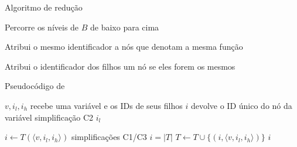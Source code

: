 \expandafter\documentclass\expandafter[table, usenames, svgnames, dvipsnames,14pt, \classopts]{beamer}
\begin{document}
\begin{frame}{Algoritmo de redução}

    \small
    \begin{outline}
        \1 Percorre os níveis de $B$ de baixo para cima
            
        \1 Atribui o mesmo identificador a nós que denotam a mesma função
        
        \1 Atribui o identificador dos filhos um nó se eles forem os mesmos
    \end{outline}

\end{frame}

\begin{frame}{Pseudocódigo de }
    \begin{algorithm}[H]
        \scriptsize
        \begin{algorithmic}[1]
            \Require $v,i_l,i_h$ \Comment recebe uma variável e os IDs de seus filhos
            \Ensure $i$ \Comment devolve o ID único do nó da variável
                     \Comment simplificação C2
                        \State \Return $i_l$
                    \EndIf
                \EndIf
            
                \State $i \gets T(\langle v,i_l,i_h \rangle)$
                 \Comment simplificações C1/C3
                    \State $i = |T|$
                    \State $T \gets T \cup \{(i, \langle v,i_l,i_h \rangle)\}$
                \EndIf
                \State \Return $i$
            \EndFunction
        \end{algorithmic}
    \end{algorithm}

\end{frame}
\end{document}
